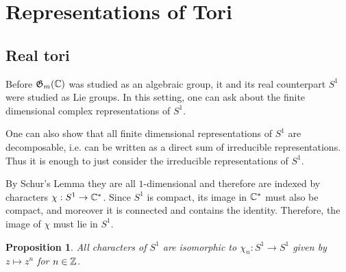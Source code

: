 \documentclass{amsart}
\numberwithin{equation}{section}
\theoremstyle{plain} %
\newtheorem{proposition}[equation]{Proposition}
\theoremstyle{definition}
\theoremstyle{remark}
\begin{document}




\section{Representations of Tori}
\subsection{Real tori}
Before $\mathfrak{G}_m(\mathbb{C})$ was studied as an algebraic group, it and its real counterpart $S^1$ were studied as Lie groups.
In this setting, one can ask about the finite dimensional complex representations of $S^1$.

\hfill 

One can also show that all finite dimensional representations of $S^1$ are decomposable, i.e.
can be written as a direct sum of irreducible representations. Thus it is enough to just consider the irreducible representations of $S^1$.

\hfill 

By Schur's Lemma they are all $1$-dimensional and therefore are indexed by characters $\chi: S^1\to \mathbb{C}^*$.
Since $S^1$ is compact, its image in $\mathbb{C}^*$ must also be compact, and moreover
it is connected and contains the identity. Therefore, the image of $\chi$ must lie in $S^1$.


\begin{proposition}
All characters of $S^1$ are isomorphic to $\chi_n: S^1\to S^1$ given by $z\mapsto z^n$ for $n\in \mathbb{Z}$.
\end{proposition}
\end{document}
